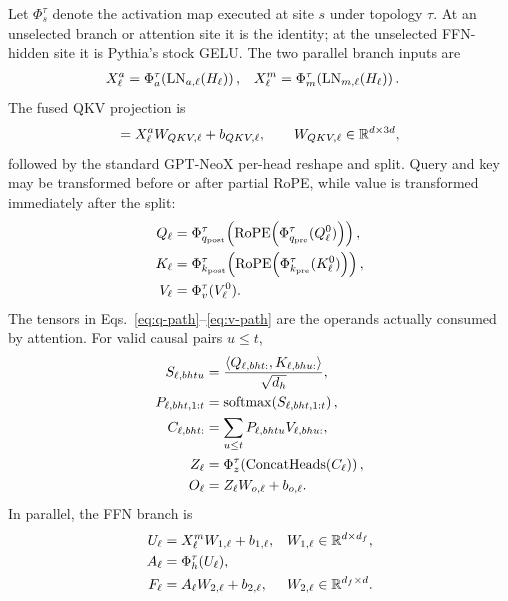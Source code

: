 Let $\Phi_s^\tau$ denote the activation map executed at site $s$ under topology
$\tau$. At an unselected branch or attention site it is the identity; at the
unselected FFN-hidden site it is Pythia's stock GELU. The two parallel branch
inputs are
\begin{align}
    X^a_\ell
      &= \Phi_a^\tau\!\left(\operatorname{LN}_{a,\ell}(H_\ell)\right),
    &
    X^m_\ell
      &= \Phi_m^\tau\!\left(\operatorname{LN}_{m,\ell}(H_\ell)\right).
    \label{eq:branch-inputs}
\end{align}
The fused QKV projection is
\begin{equation}
    [Q^0_\ell\mid K^0_\ell\mid V^0_\ell]
      = X^a_\ell W_{QKV,\ell}+b_{QKV,\ell},
    \qquad W_{QKV,\ell}\in\R^{d\times3d},
    \label{eq:qkv-projection}
\end{equation}
followed by the standard GPT-NeoX per-head reshape and split. Query and key may
be transformed before or after partial RoPE, while value is transformed
immediately after the split:
\begin{align}
    Q_\ell
      &= \Phi_{q_{\mathrm{post}}}^\tau\!\left(
           \operatorname{RoPE}\!\left(\Phi_{q_{\mathrm{pre}}}^\tau(Q^0_\ell)\right)
         \right),
    \label{eq:q-path}\\
    K_\ell
      &= \Phi_{k_{\mathrm{post}}}^\tau\!\left(
           \operatorname{RoPE}\!\left(\Phi_{k_{\mathrm{pre}}}^\tau(K^0_\ell)\right)
         \right),
    \label{eq:k-path}\\
    V_\ell
      &= \Phi_v^\tau(V^0_\ell).
    \label{eq:v-path}
\end{align}
The tensors in Eqs.~\eqref{eq:q-path}--\eqref{eq:v-path} are the operands
actually consumed by attention. For valid causal pairs $u\le t$,
\begin{align}
    S_{\ell,bhtu}
      &=\frac{\langle Q_{\ell,bht:},K_{\ell,bhu:}\rangle}{\sqrt{d_h}},
    \label{eq:attention-score}\\
    P_{\ell,bht,1:t}
      &=\operatorname{softmax}\!\left(S_{\ell,bht,1:t}\right),
    \label{eq:attention-probabilities}\\
    C_{\ell,bht:}
      &=\sum_{u\le t}P_{\ell,bhtu}V_{\ell,bhu:},
    \label{eq:attention-context}\\
    Z_\ell
      &=\Phi_z^\tau\!\left(\operatorname{ConcatHeads}(C_\ell)\right),
    \label{eq:pre-wo-context}\\
    O_\ell
      &=Z_\ell W_{o,\ell}+b_{o,\ell}.
    \label{eq:attention-output}
\end{align}
In parallel, the FFN branch is
\begin{align}
    U_\ell &= X^m_\ell W_{1,\ell}+b_{1,\ell},
    & W_{1,\ell}&\in\mathbb{R}^{d\times d_f},
    \label{eq:ffn-up}\\
    A_\ell &= \Phi_h^\tau(U_\ell),
    \label{eq:ffn-activation}\\
    F_\ell &= A_\ell W_{2,\ell}+b_{2,\ell},
    & W_{2,\ell}&\in\mathbb{R}^{d_f\times d}.
    \label{eq:ffn-down}
\end{align}
